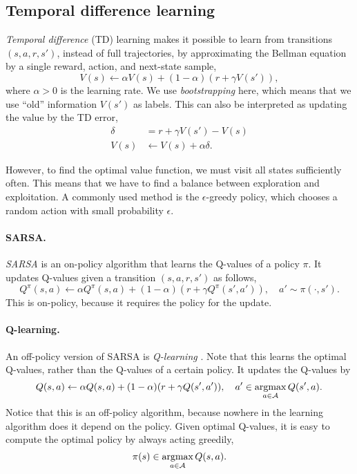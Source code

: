\subsection{Temporal difference learning}

\textit{Temporal difference} (TD) learning makes it possible to learn from transitions $(s,a,r,s')$,
instead of full trajectories, by approximating the Bellman equation by a single reward, action,
and next-state sample, \[
    V(s) \gets \alpha V(s) + (1-\alpha) (r + \gamma V(s')),
\]
where $\alpha > 0$ is the learning rate. We use \textit{bootstrapping} here, which means that we
use ``old'' information $V(s')$ as labels. This can also be interpreted as updating the value by
the TD error,
\begin{align*}
    \delta & = r + \gamma V(s') - V(s)   \\
    V(s)   & \gets V(s) + \alpha \delta.
\end{align*}

However, to find the optimal value function, we must visit all states sufficiently often. This
means that we have to find a balance between exploration and exploitation. A commonly used method
is the $\epsilon$-greedy policy, which chooses a random action with small probability $\epsilon$.

\paragraph{SARSA.} \textit{SARSA} \citep{rummery1994line} is an on-policy algorithm that learns the
Q-values of a policy $\pi$. It updates Q-values given a transition $(s, a, r, s')$ as follows, \[
    Q^\pi(s,a) \gets \alpha Q^\pi(s,a) + (1-\alpha) (r + \gamma Q^\pi(s', a')), \quad a' \sim \pi(\cdot, s').
\]
This is on-policy, because it requires the policy for the update.

\paragraph{Q-learning.} An off-policy version of SARSA is \textit{Q-learning} \citep{watkins1992q}. Note that this learns
the optimal Q-values, rather than the Q-values of a certain policy. It updates the Q-values by \[
    Q(s,a) \gets \alpha Q(s,a) + (1-\alpha) (r + \gamma Q(s', a')), \quad a' \in \operatorname*{argmax}_{a \in \mathcal{A}} Q(s', a).
\]
Notice that this is an off-policy algorithm, because nowhere in the learning algorithm does it
depend on the policy. Given optimal Q-values, it is easy to compute the optimal policy by always
acting greedily, \[
    \pi(s) \in \operatorname*{argmax}_{a \in \mathcal{A}} Q(s, a).
\]

